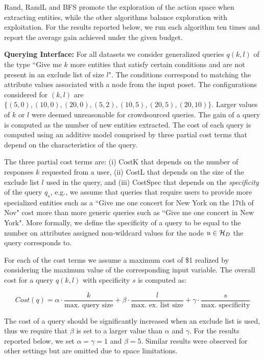 Rand, RandL and BFS promote the exploration of the action space when extracting entities, while the other algorithms balance exploration with exploitation. For the results reported below, we run each algorithm ten times and report the average gain achieved under the given budget.

\vspace{5pt}\noindent\textbf{Querying Interface:} For all datasets we consider generalized queries $q(k,l)$ of the type ``Give me $k$ more entities that satisfy certain conditions and are not present in an exclude list of size $l$". The conditions correspond to matching the attribute values associated with a node from the input poset. The  configurations considered for $(k,l)$ are $\{(5,0), (10,0), (20,0), (5,2), (10,5), (20,5), (20,10)\}$. Larger values of $k$ or $l$ were deemed unreasonable for crowdsourced queries. The gain of a query is computed as the number of new entities extracted. The cost of each query is computed using an additive model comprised by three partial cost terms that depend on the characteristics of the query. 

The three partial cost terms are: (i) {\sf CostK} that depends on the number of responses $k$ requested from a user, (ii) {\sf CostL} that depends on the size of the exclude list $l$ used in the query, and (iii) {\sf CostSpec} that depends on the {\em specificity} of the query $q_s$, e.g., we assume that queries that require users to provide more specialized entities such as a ``Give me one concert for New York on the 17th of Nov" cost more than more generic queries such as ``Give me one concert in New York". More formally, we define the specificity of a query to be equal to the number on attributes assigned non-wildcard values for the node $u \in \mathcal{H}_D$ the query corresponds to. 

For each of the cost terms we assume a maximum cost of \$1 realized by considering the maximum value of the corresponding input variable. The overall cost for a query $q(k,l)$ with specificity $s$ is computed as:

{\small
\begin{equation}
Cost(q) = \alpha \cdot \frac{k}{\mbox{max. query size}} + \beta \cdot  \frac{l}{\mbox{max. ex. list size}} + \gamma \cdot  \frac{s}{\mbox{max. specificity}} \nonumber
\end{equation}}

The cost of a query should be significantly increased when an exclude list is used, thus we require that $\beta$ is set to a larger value than $\alpha$ and $\gamma$. For the results reported below, we set $\alpha = \gamma = 1$ and $\beta = 5$. Similar results were observed for other settings but are omitted due to space limitations.

